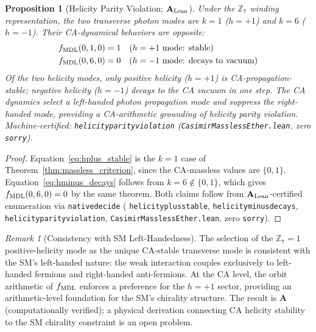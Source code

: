 \documentclass[11pt]{article}
\newtheorem{proposition}[theorem]{Proposition}
\theoremstyle{remark}
\newtheorem{remark}[theorem]{Remark}
\newcommand{\lean}[1]{%
  \penalty-100
  \begingroup\def\_{\textunderscore\allowbreak}\texttt{#1}\endgroup}
\newcommand{\CatA}{\textbf{A}}
\newcommand{\CatAL}{\ensuremath{\textbf{A}_{\rm Lean}}}
\begin{document}
\begin{proposition}[Helicity Parity Violation; $\CatAL$]
\label{prop:helicity}
Under the $\mathbb{Z}_7$ winding representation, the two transverse
photon modes are $k = 1$ ($h = +1$) and $k = 6$ ($h = -1$).  Their
CA-dynamical behaviors are opposite:
\begin{align}
  f_{\rm MDL}(0, 1, 0) &= 1 \quad \text{(}h = +1\text{ mode: stable)}
  \label{eq:hplus_stable}\\
  f_{\rm MDL}(0, 6, 0) &= 0 \quad \text{(}h = -1\text{ mode: decays to vacuum)}
  \label{eq:hminus_decays}
\end{align}
Of the two helicity modes, only positive helicity ($h = +1$) is
CA-propagation-stable; negative helicity ($h = -1$) decays to the CA vacuum
in one step.  The CA dynamics select a left-handed photon propagation mode
and suppress the right-handed mode, providing a CA-arithmetic grounding of
helicity parity violation.  Machine-certified:
\lean{helicity\_parity\_violation} (\texttt{CasimirMasslessEther.lean},
zero \texttt{sorry}).
\end{proposition}

\begin{proof}
Equation~\eqref{eq:hplus_stable} is the $k = 1$ case of
Theorem~\ref{thm:massless_criterion}, since the CA-massless values are
$\{0, 1\}$.  Equation~\eqref{eq:hminus_decays} follows from
$k = 6 \notin \{0,1\}$, which gives $f_{\rm MDL}(0,6,0) = 0$ by
the same theorem.  Both claims follow from $\CatAL$-certified enumeration
via \lean{native\_decide} (\lean{helicity\_plus\_stable},
\lean{helicity\_minus\_decays}, \lean{helicity\_parity\_violation},
\texttt{CasimirMasslessEther.lean}, zero \texttt{sorry}).
\end{proof}

\begin{remark}[Consistency with SM Left-Handedness]
The selection of the $\mathbb{Z}_7 = 1$ positive-helicity mode as the unique
CA-stable transverse mode is consistent with the SM's left-handed nature:
the weak interaction couples exclusively to left-handed fermions and
right-handed anti-fermions.  At the CA level, the orbit arithmetic of
$f_{\rm MDL}$ enforces a preference for the $h = +1$ sector, providing
an arithmetic-level foundation for the SM's chirality structure.
The result is $\CatA$ (computationally verified); a physical derivation
connecting CA helicity stability to the SM chirality constraint is an
open problem.
\end{remark}
\end{document}
